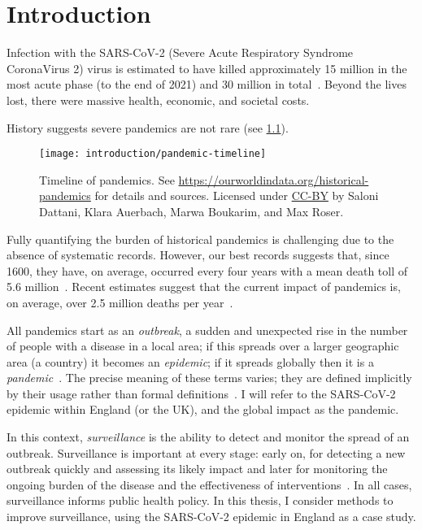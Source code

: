 \documentclass[thesis.tex]{subfiles}
\begin{document}
\chapter{Introduction} \label{intro}

Infection with the SARS-CoV-2 (Severe Acute Respiratory Syndrome CoronaVirus 2) virus is estimated to have killed approximately 15 million in the most acute phase (to the end of 2021) and 30 million in total~\autocite{whoCOVIDExcess,economistCOVIDExcess}.
Beyond the lives lost, there were massive health, economic, and societal costs.

History suggests severe pandemics are not rare (see \cref{intro:fig:pandemic-timeline}).
\begin{figure}
    \texttt{[image: introduction/pandemic-timeline]}
    \caption[Timeline of pandemics.]{%
        Timeline of pandemics.
        See \url{https://ourworldindata.org/historical-pandemics} for details and sources.
        Licensed under \href{https://creativecommons.org/licenses/by/4.0/}{CC-BY} by Saloni Dattani, Klara Auerbach, Marwa Boukarim, and Max Roser.
    }
    \label{intro:fig:pandemic-timeline}
\end{figure}
Fully quantifying the burden of historical pandemics is challenging due to the absence of systematic records.
However, our best records suggests that, since 1600, they have, on average, occurred every four years with a mean death toll of 5.6 million~\autocite{maraniNovelEpidemics}.
Recent estimates suggest that the current impact of pandemics is, on average, over 2.5 million deaths per year~\autocite{madhavPandemicMortality}.

All pandemics start as an \emph{outbreak}, a sudden and unexpected rise in the number of people with a disease in a local area; if this spreads over a larger geographic area (\eg a country) it becomes an \emph{epidemic}; if it spreads globally then it is a \emph{pandemic}~\autocite{grennanPandemic}.
The precise meaning of these terms varies; they are defined implicitly by their usage rather than formal definitions~\autocite{morensPandemic,doshiElusive}.
I will refer to the SARS-CoV-2 epidemic within England (or the UK), and the global impact as the pandemic.

In this context, \emph{surveillance} is the ability to detect and monitor the spread of an outbreak.
Surveillance is important at every stage: early on, for detecting a new outbreak quickly and assessing its likely impact and later for monitoring the ongoing burden of the disease and the effectiveness of interventions~\autocite{whoFluSurveillance}.
In all cases, surveillance informs public health policy.
In this thesis, I consider methods to improve surveillance, using the SARS-CoV-2 epidemic in England as a case study.
\end{document}
